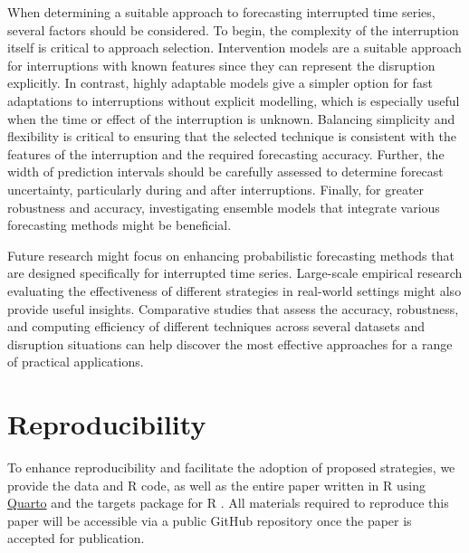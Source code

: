 \documentclass[
  11pt,
  a4paper,
]{article}
\begin{document}
When determining a suitable approach to forecasting interrupted time
series, several factors should be considered. To begin, the complexity
of the interruption itself is critical to approach selection.
Intervention models are a suitable approach for interruptions with known
features since they can represent the disruption explicitly. In
contrast, highly adaptable models give a simpler option for fast
adaptations to interruptions without explicit modelling, which is
especially useful when the time or effect of the interruption is
unknown. Balancing simplicity and flexibility is critical to ensuring
that the selected technique is consistent with the features of the
interruption and the required forecasting accuracy. Further, the width
of prediction intervals should be carefully assessed to determine
forecast uncertainty, particularly during and after interruptions.
Finally, for greater robustness and accuracy, investigating ensemble
models that integrate various forecasting methods might be beneficial.

Future research might focus on enhancing probabilistic forecasting
methods that are designed specifically for interrupted time series.
Large-scale empirical research evaluating the effectiveness of different
strategies in real-world settings might also provide useful insights.
Comparative studies that assess the accuracy, robustness, and computing
efficiency of different techniques across several datasets and
disruption situations can help discover the most effective approaches
for a range of practical applications.

\section*{Reproducibility}\label{reproducibility}

To enhance reproducibility and facilitate the adoption of proposed
strategies, we provide the data and R code, as well as the entire paper
written in R using \href{https://quarto.org/}{Quarto} and the targets
package for R \autocite{targetsr2021}. All materials required to
reproduce this paper will be accessible via a public GitHub repository
once the paper is accepted for publication.


\printbibliography[title=References]
\end{document}
